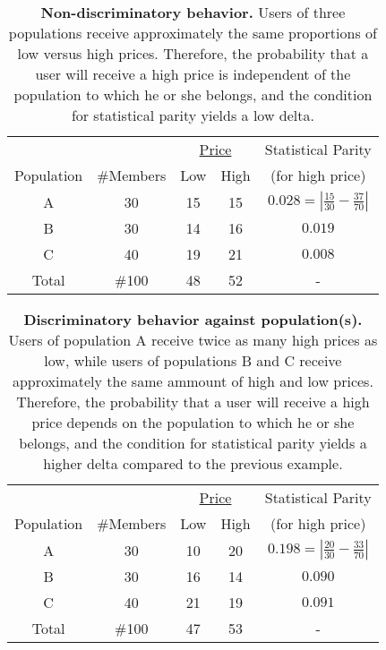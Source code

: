 \begin{table}[h]
{
  \renewcommand{\arraystretch}{1.5}
  \begin{tabular}{ c | c | c  c | c }
    & & \multicolumn{2}{|c|}{\underline{Price}} &  Statistical Parity\\
    Population & \#Members & Low & High & (for high price) \\
    \hline
    A & 30 &  15 & 15 & $0.028 = | \frac{15}{30} - \frac{37}{70}|$ \\
    B & 30 &  14 & 16 & $0.019$ \\
    C & 40 &  19 & 21 & $0.008$ \\
    \hline
    Total & \#100 & 48 & 52 & - \\
  \end{tabular}
  \caption{{\bf Non-discriminatory behavior.} Users of three populations receive approximately
  the same proportions of low versus high prices. Therefore, the probability that a user
  will receive a high price is independent of the population to which he or she belongs,
  and the condition for statistical parity yields a low delta.}
  \label{tab:NondiscriminationExample}
} \end{table}

\begin{table}[h]
{
  \renewcommand{\arraystretch}{1.5}
  \begin{tabular}{ c | c | c  c | c }
    & & \multicolumn{2}{|c|}{\underline{Price}} &  Statistical Parity\\
    Population & \#Members & Low & High & (for high price) \\
    \hline
    A & 30 &  10 & 20 & $0.198 = | \frac{20}{30} - \frac{33}{70}|$ \\
    B & 30 &  16 & 14 & $0.090$ \\
    C & 40 &  21 & 19 & $0.091$ \\
    \hline
    Total & \#100 & 47 & 53 & - \\
  \end{tabular}
  \caption{{\bf Discriminatory behavior against population(s).} Users of population A receive twice
  as many high prices as low, while users of populations B and C receive approximately the same
  ammount of high and low prices. Therefore, the probability that a user will receive a high price
  depends on the population to which he or she belongs, and the condition for statistical parity
  yields a higher delta compared to the previous example. }
  \label{tab:DiscrimniationExample}
} \end{table}

